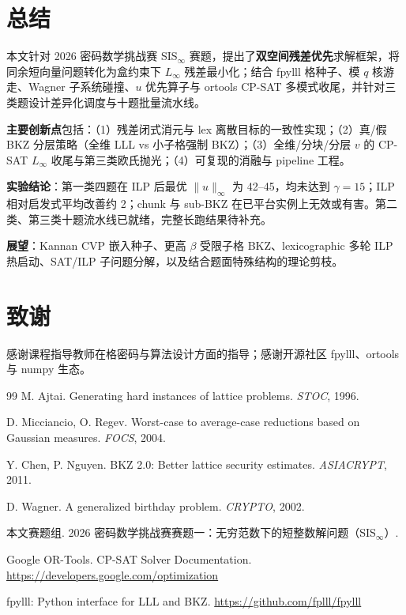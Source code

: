 \documentclass[12pt,a4paper]{ctexart}
\begin{document}
\section{总结}

本文针对 2026 密码数学挑战赛 SIS$_{\infty}$ 赛题，提出了\textbf{双空间残差优先}求解框架，将同余短向量问题转化为盒约束下 $L_{\infty}$ 残差最小化；结合 fpylll 格种子、模 $q$ 核游走、Wagner 子系统碰撞、$u$ 优先算子与 ortools CP-SAT 多模式收尾，并针对三类题设计差异化调度与十题批量流水线。

\textbf{主要创新点}包括：（1）残差闭式消元与 lex 离散目标的一致性实现；（2）真/假 BKZ 分层策略（全维 LLL vs 小子格强制 BKZ）；（3）全维/分块/分层 $v$ 的 CP-SAT $L_{\infty}$ 收尾与第三类欧氏抛光；（4）可复现的消融与 pipeline 工程。

\textbf{实验结论}：第一类四题在 ILP 后最优 $\|u\|_{\infty}$ 为 42--45，均未达到 $\gamma=15$；ILP 相对启发式平均改善约 2；chunk 与 sub-BKZ 在已平台实例上无效或有害。第二类、第三类十题流水线已就绪，完整长跑结果待补充。

\textbf{展望}：Kannan CVP 嵌入种子、更高 $\beta$ 受限子格 BKZ、lexicographic 多轮 ILP 热启动、SAT/ILP 子问题分解，以及结合题面特殊结构的理论剪枝。

\section*{致谢}
感谢课程指导教师在格密码与算法设计方面的指导；感谢开源社区 fpylll、ortools 与 numpy 生态。

\begin{thebibliography}{99}
M. Ajtai. Generating hard instances of lattice problems. \textit{STOC}, 1996.

D. Micciancio, O. Regev. Worst-case to average-case reductions based on Gaussian measures. \textit{FOCS}, 2004.

Y. Chen, P. Nguyen. BKZ 2.0: Better lattice security estimates. \textit{ASIACRYPT}, 2011.

D. Wagner. A generalized birthday problem. \textit{CRYPTO}, 2002.

本文赛题组. 2026 密码数学挑战赛赛题一：无穷范数下的短整数解问题（SIS$_{\infty}$）.

Google OR-Tools. CP-SAT Solver Documentation. \url{https://developers.google.com/optimization}

fpylll: Python interface for LLL and BKZ. \url{https://github.com/fplll/fpylll}
\end{thebibliography}
\end{document}
